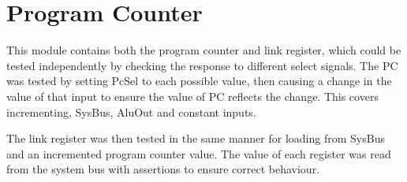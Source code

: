 
\section{Program Counter}

This module contains both the program counter and link register, which could be tested independently by checking the response to different select signals. The PC was tested by setting PcSel to each possible value, then causing a change in the value of that input to ensure the value of PC reflects the change. This covers incrementing, SysBus, AluOut and constant inputs. 

The link register was then tested in the same manner for loading from SysBus and an incremented program counter value. The value of each register was read from the system bus with assertions to ensure correct behaviour. 

